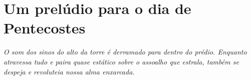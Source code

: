 \section{Um prelúdio para o dia de Pentecostes}
\textit{O som dos sinos do alto da torre é derramado para dentro do prédio.
Enquanto atravessa tudo e paira quase estático sobre o assoalho que estrala, também
se despeja e revoluteia nossa alma enxarcada.}


